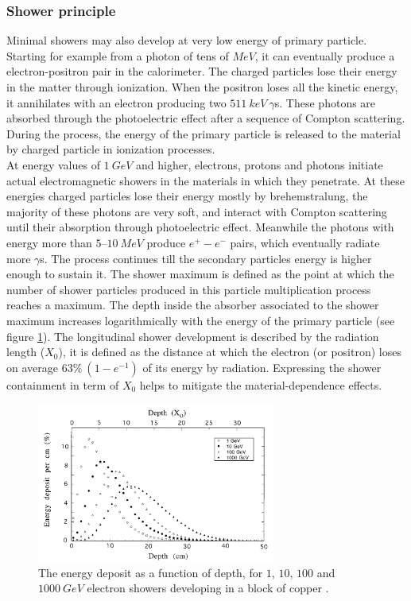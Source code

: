 \subsubsection*{Shower principle}
Minimal showers may also develop at very low energy of primary particle. Starting for example from a photon of tens of $MeV$, it can eventually produce a electron-positron pair in the calorimeter. The  charged  particles lose their energy in the matter through ionization. When the  positron loses all the kinetic energy, it annihilates with an electron producing two $511\ keV\ \gamma$s. These photons are absorbed through the photoelectric effect after a sequence of Compton scattering. During the process, the energy of the primary particle is released to the material by charged particle in ionization processes.\\
At energy values of $1\ GeV$ and higher, electrons, protons and photons initiate actual electromagnetic showers in the materials in which they penetrate. At these energies charged particles lose their energy mostly by brehemstralung, the majority of these photons are very soft, and interact with Compton scattering until their absorption through photoelectric effect. Meanwhile the photons with energy more than $5–10\ MeV$ produce $e^+-e^-$ pairs, which eventually radiate more $\gamma$s. The process continues till the secondary particles energy is higher enough to sustain it. The shower maximum is defined as the point at which the number of shower particles produced in this particle multiplication process reaches a maximum. The depth inside the absorber associated to the shower maximum increases logarithmically with the energy of the primary particle (see figure \ref{fig:shower_max}). The longitudinal shower development is described by the radiation length ($X_0$), it is defined as the distance at which the electron (or positron) loses on average $63\%\ (1-e^{-1})$ of its energy by radiation. Expressing the shower containment in term of $X_0$ helps to mitigate the material-dependence effects.

\begin{figure}
	\centering
	\includegraphics[width=0.7\textwidth]{IMG/Cap2/shower_max.png}
	\caption{The energy deposit as a function of depth, for $1$, $10$, $100$ and $1000\ GeV$ electron showers developing in a block of copper \cite{Leo}.}
	\label{fig:shower_max}
\end{figure}

